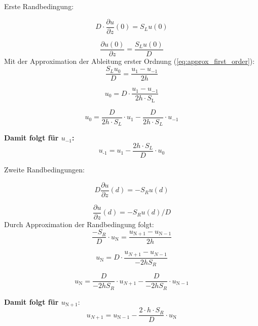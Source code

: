 Erste Randbedingung:

\begin{equation}
	D\cdot \frac{\partial u}{\partial z}(0)=S_Lu(0)
\end{equation}

\begin{equation}
	\frac{\partial u(0)}{\partial z}=\frac{S_Lu(0)}{D}
\end{equation}
Mit der Approximation der Ableitung erster Ordnung
(\cref{eq:approx_first_order}):
\begin{equation}
	\frac{S_Lu_0}{D} = \frac{u_1-u_{-1}}{2h}
\end{equation}

\begin{equation}
	u_0 = D\cdot \frac{u_1-u_{-1}}{2h\cdot S_\mathrm{L}}
\end{equation}

\begin{equation}
	u_0 = \frac{D}{2h\cdot S_L} \cdot u_1 - \frac{D}{2h\cdot S_L} \cdot
	u_{-1}
\end{equation}


	\textbf{Damit folgt für $u_{-1}$:}
	\begin{equation}\label{eq:rand_u-1}
		u_{\text{-}1} = u_1 - \frac{2h\cdot S_L}{D} \cdot u_0
	\end{equation}


Zweite Randbedingungen:

\begin{equation}
	D\frac{\partial u}{\partial z}(d)=-S_Ru(d)
\end{equation}

\begin{equation}
	\frac{\partial u}{\partial z}(d)=-S_Ru(d)/D
\end{equation}
Durch Approximation der Randbedingung folgt:
\begin{equation}
	\frac{-S_R}{D}\cdot u_\mathrm{N} =
	\frac{u_{\mathrm{N}+1}-u_{\mathrm{N}-1}}{2h}
\end{equation}

\begin{equation}
	u_\mathrm{N} = D\cdot \frac{u_{N+1}-u_{N-1}}{-2hS_R}
\end{equation}

\begin{equation}
	u_\mathrm{N} = \frac{D}{-2hS_R} \cdot u_{N+1} - \frac{D}{-2hS_R} \cdot
	u_{\mathrm{N}-1}
\end{equation}


	\textbf{Damit folgt für $u_{\mathrm{N}+1}$}:
	\begin{equation}\label{eq:approx_RN}
		u_{N+1} =u_{\mathrm{N}-1} -\frac{2\cdot h\cdot S_R}{D} \cdot
		u_\mathrm{N}
	\end{equation}


